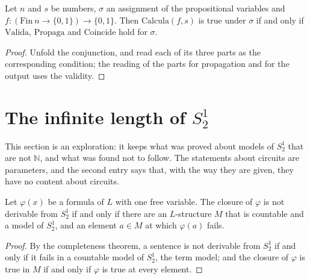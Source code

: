 \begin{theorem}
  \label{thm:arithmetic-evalb-calcula}
  \leanok
  Let $n$ and $s$ be numbers, $\sigma$ an assignment of the propositional variables and $f :
  (\mathrm{Fin}\ n \to \{0,1\}) \to \{0,1\}$. Then $\mathrm{Calcula}(f, s)$ is true under $\sigma$ if
  and only if $\mathrm{Valida}$, $\mathrm{Propaga}$ and $\mathrm{Coincide}$ hold for $\sigma$.
\end{theorem}

\begin{proof}
  \leanok
  Unfold the conjunction, and read each of its three parts as the corresponding condition; the
  reading of the parts for propagation and for the output uses the validity.
\end{proof}

\section{The infinite length of $S^1_2$}
\label{sec:arithmetic-long}

This section is an exploration: it keeps what was proved about models of $S^1_2$ that are not
$\mathbb{N}$, and what was found not to follow. The statements about circuits are parameters, and the
second entry says that, with the way they are given, they have no content about circuits.

\begin{theorem}
  \label{thm:arithmetic-long-countermodel}
  \leanok
  Let $\varphi(x)$ be a formula of $L$ with one free variable. The closure of $\varphi$ is not
  derivable from $S^1_2$ if and only if there are an $L$-structure $M$ that is countable and a model
  of $S^1_2$, and an element $a \in M$ at which $\varphi(a)$ fails.
  \own{}
  \exploration{}
\end{theorem}

\begin{proof}
  \leanok
  By the completeness theorem, a sentence is not derivable from $S^1_2$ if and only if it fails in a
  countable model of $S^1_2$, the term model; and the closure of $\varphi$ is true in $M$ if and only
  if $\varphi$ is true at every element.
\end{proof}

